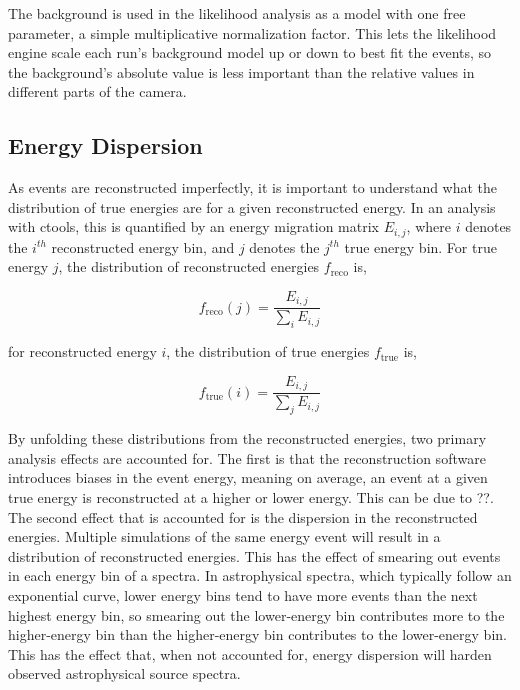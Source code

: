    The background is used in the likelihood analysis as a model with one free parameter, a simple multiplicative normalization factor.
    This lets the likelihood engine scale each run's background model up or down to best fit the events, so the background's absolute value is less important than the relative values in different parts of the camera.

  \subsection{Energy Dispersion}\label{subsec:edisp}
    As events are reconstructed imperfectly, it is important to understand what the distribution of true energies are for a given reconstructed energy.
    In an analysis with ctools, this is quantified by an energy migration matrix $E_{i,j}$, where $i$ denotes the $i^{th}$ reconstructed energy bin, and $j$ denotes the $j^{th}$ true energy bin.
    For true energy $j$, the distribution of reconstructed energies $f_{\text{reco}}$ is,

    \begin{equation}
      \label{eqn:edispreco}
      f_{\text{reco}}(j)=\frac{E_{i,j}}{ \sum_{i}E_{i,j} }
    \end{equation}

    for reconstructed energy $i$, the distribution of true energies $f_{\text{true}}$ is,

    \begin{equation}
      \label{eqn:edisptrue}
      f_{\text{true}}(i)=\frac{E_{i,j}}{ \sum_{j}E_{i,j} }
    \end{equation}

    By unfolding these distributions from the reconstructed energies, two primary analysis effects are accounted for.
    The first is that the reconstruction software introduces biases in the event energy, meaning on average, an event at a given true energy is reconstructed at a higher or lower energy.
    This can be due to ??.
    The second effect that is accounted for is the dispersion in the reconstructed energies.
    Multiple simulations of the same energy event will result in a distribution of reconstructed energies.
    This has the effect of smearing out events in each energy bin of a spectra.
    In astrophysical spectra, which typically follow an exponential curve, lower energy bins tend to have more events than the next highest energy bin, so smearing out the lower-energy bin contributes more to the higher-energy bin than the higher-energy bin contributes to the lower-energy bin.
    This has the effect that, when not accounted for, energy dispersion will harden observed astrophysical source spectra.

